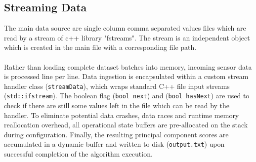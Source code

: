 \subsection{Streaming Data}
The main data source are single column comma separated values files which are read by a stream of c++ library "fstreams". The stream is an independent object which is created in the main file with a corresponding file path. \\ \\

Rather than loading complete dataset batches into memory, incoming sensor data is  processed line per line.
Data ingestion is encapsulated within a custom stream handler class (\texttt{streamData}), which wraps standard C++ file input streams (\texttt{std::ifstream}). The boolean flag (\texttt{bool next}) and (\texttt{bool hasNext}) are used to check if there are still some values left in the file which can be read by the handler.
To eliminate potential data crashes, data races and runtime memory reallocation overhead, all operational state buffers are pre-allocated on the stack during configuration.
Finally, the resulting principal component scores are accumulated in a dynamic buffer and written to disk (\texttt{output.txt}) upon successful completion of the algorithm execution.